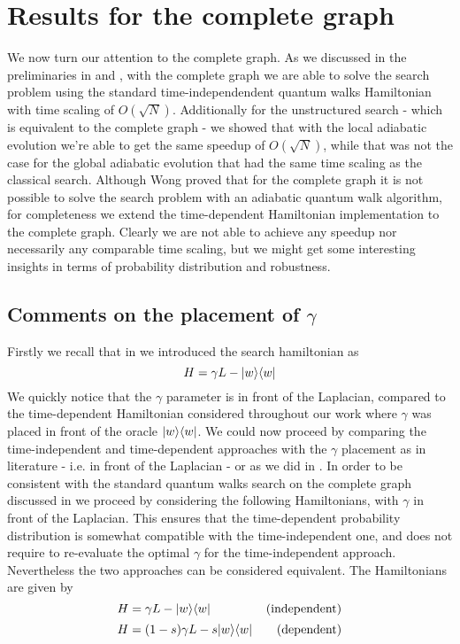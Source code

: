 \section{Results for the complete graph}
We now turn our attention to the complete graph. As we discussed in the preliminaries in  and , with the complete graph we are able to solve the search problem using the standard time-independendent quantum walks Hamiltonian with time scaling of $O(\sqrt{N})$. Additionally for the unstructured search - which is equivalent to the complete graph - we showed that with the local adiabatic evolution we're able to get the same speedup of $O(\sqrt{N})$, while that was not the case for the global adiabatic evolution that had the same time scaling as the classical search. Although Wong proved that for the complete graph it is not possible to solve the search problem with an adiabatic quantum walk algorithm, for completeness we extend the time-dependent Hamiltonian implementation to the complete graph. Clearly we are not able to achieve any speedup nor necessarily any comparable time scaling, but we might get some interesting insights in terms of probability distribution and robustness.

    \subsection{Comments on the placement of $\gamma$}
    Firstly we recall that in  we introduced the search hamiltonian as
    \begin{equation}
      H = \gamma L -{|{w}\rangle}{\langle{w}|}
    \end{equation}
    We quickly notice that the $\gamma$ parameter is in front of the Laplacian, compared to the time-dependent Hamiltonian considered throughout our work where $\gamma$ was placed in front of the oracle ${|{w}\rangle}{\langle{w}|}$. We could now proceed by comparing the time-independent and time-dependent approaches with the $\gamma$ placement as in literature - i.e. in front of the Laplacian - or as we did in . In order to be consistent with the standard quantum walks search on the complete graph discussed in  we proceed by considering the following Hamiltonians, with $\gamma$ in front of the Laplacian. This ensures that the time-dependent probability distribution is somewhat compatible with the time-independent one, and does not require to re-evaluate the optimal $\gamma$ for the time-independent approach. Nevertheless the two approaches can be considered equivalent. The Hamiltonians are given by
    \begin{equation}
      H = \gamma L-{|{w}\rangle}{\langle{w}|}\hspace{45pt}\mbox{(independent)}
    \end{equation}
    \vspace{-0.5cm}
    \begin{equation}
      H = (1-s)\gamma L - s{|{w}\rangle}{\langle{w}|}\hspace{20pt}\mbox{(dependent)}
    \end{equation}\\



